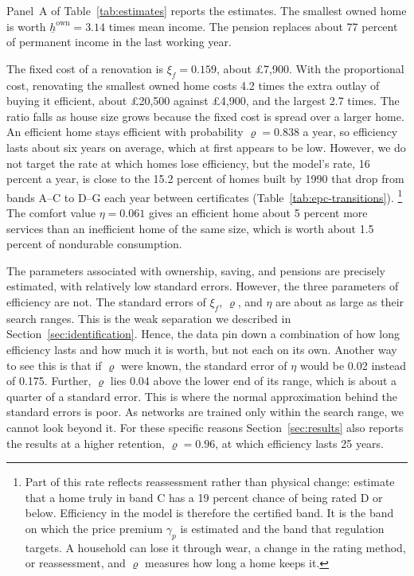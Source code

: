Panel~A of Table~\ref{tab:estimates} reports the estimates. The smallest owned home is
worth $\underline h^{\mathrm{own}}=3.14$ times mean income. The pension replaces about 77 percent of permanent income in the last working year.

The fixed cost of a renovation is $\xi_f=0.159$, about \pounds7,900. With
the proportional cost, renovating the smallest owned home costs 4.2 times
the extra outlay of buying it efficient, about \pounds20,500 against
\pounds4,900, and the largest 2.7 times. The ratio falls as house size grows because
the fixed cost is spread over a larger home. An efficient home stays efficient with probability $\varrho=0.838$ a
year, so efficiency lasts about six years on average, which at first appears to be low. However, we do not target the
rate at which homes lose efficiency, but the model's rate, 16 percent a
year, is close to the 15.2 percent of homes built by 1990 that drop from
bands A--C to D--G each year between certificates (Table~\ref{tab:epc-transitions}).%
\footnote{Part of this rate reflects reassessment rather than physical change:
\citet[Table~3]{crawley2019quantifying} estimate that a home truly in band C
has a 19 percent chance of being rated D or below.
Efficiency in the model is therefore the certified band. It is the band on
which the price premium $\gamma_p$ is estimated and the band that
regulation targets. A household can lose it through wear, a change in the
rating method, or reassessment, and $\varrho$ measures how long a home
keeps it.}
The comfort value $\eta=0.061$ gives an efficient home about 5 percent more
services than an inefficient home of the same size, which is worth about
1.5 percent of nondurable consumption.

The parameters associated with ownership, saving, and pensions are precisely estimated, with relatively low standard errors. However,
the three parameters of efficiency are not. The standard errors of $\xi_f$,
$\varrho$, and $\eta$ are about as large as their search ranges. This is the
weak separation we described in Section~\ref{sec:identification}.  Hence, the data
pin down a combination of how long efficiency lasts and how much it is
worth, but not each on its own. Another way to see this is that if $\varrho$ were known, the standard error of
$\eta$ would be 0.02 instead of 0.175. Further, $\varrho$ lies 0.04
above the lower end of its range, which is about a quarter of a standard error. This is where the
normal approximation behind the standard errors is poor. As  networks are
trained only within the search range, we cannot look beyond it. For these specific
reasons Section~\ref{sec:results} also reports the results at a higher
retention, $\varrho=0.96$, at which efficiency lasts 25 years.

